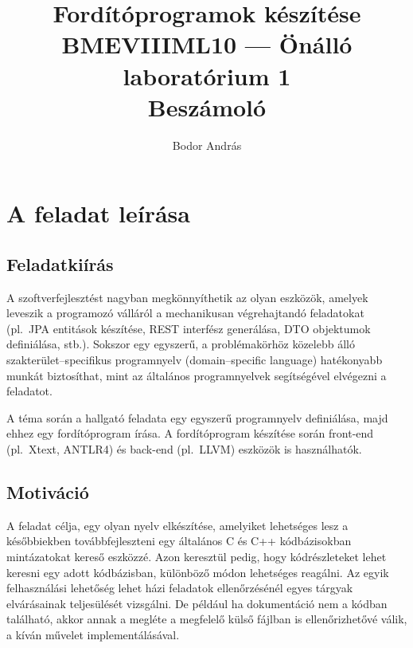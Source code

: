 \documentclass[magyar,12pt,a4paper,final,titlepage]{report}
\title{Fordítóprogramok készítése\\
BMEVIIIML10 --- Önálló laboratórium 1\\
Beszámoló}
\author{Bodor András}
\def\pl{pl.\ }
\begin{document}
    \maketitle

    \tableofcontents
    \newpage

    \onehalfspacing

    \chapter{A feladat leírása}

    \section{Feladatkiírás}\label{sec:feladat}

    \sloppy %

    A szoftverfejlesztést nagyban megkönnyíthetik az olyan eszközök, amelyek leveszik a programozó válláról a mechanikusan végrehajtandó feladatokat (\pl JPA entitások készítése, REST interfész generálása, DTO objektumok definiálása, stb.). Sokszor egy egyszerű, a problémakörhöz közelebb álló szakterület\hskip0pt--specifikus programnyelv (domain--specific language) hatékonyabb munkát biztosíthat, mint az általános programnyelvek segítségével elvégezni a feladatot.

    A téma során a hallgató feladata egy egyszerű programnyelv definiálása, majd ehhez egy fordítóprogram írása. A fordítóprogram készítése során front-end (\pl Xtext, ANTLR4) és back-end (\pl LLVM) eszközök is használhatók.

    \fussy

    \section{Motiváció}\label{sec:motiv}

    A feladat célja, egy olyan nyelv elkészítése, amelyiket lehetséges lesz a későbbiekben továbbfejleszteni egy általános C és C++ kódbázisokban mintázatokat kereső eszközzé.
    Azon keresztül pedig, hogy kódrészleteket lehet keresni egy adott kódbázisban, különböző módon lehetséges reagálni.
    Az egyik felhasználási lehetőség lehet házi feladatok ellenőrzésénél egyes tárgyak elvárásainak teljesülését vizsgálni.
    De például ha dokumentáció nem a kódban található, akkor annak a megléte a megfelelő külső fájlban is ellenőrizhetővé válik, a kíván művelet implementálásával.
\end{document}
